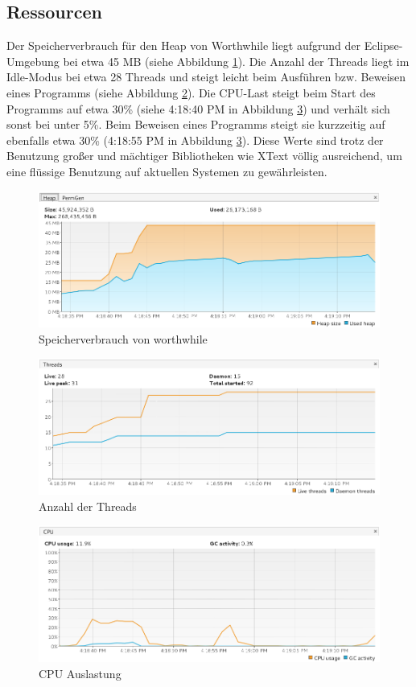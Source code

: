 \subsection{Ressourcen}
Der Speicherverbrauch für den Heap von Worthwhile liegt aufgrund der Eclipse-Umgebung bei etwa 45 MB (siehe Abbildung \ref{heapsize}). Die Anzahl der Threads liegt im Idle-Modus bei etwa 28 Threads und steigt leicht beim Ausführen bzw. Beweisen eines Programms (siehe Abbildung \ref{threadcount}). Die CPU-Last steigt beim Start des Programms auf etwa 30\% (siehe 4:18:40 PM in Abbildung \ref{cpuusage}) und verhält sich sonst bei unter 5\%. Beim Beweisen eines Programms steigt sie kurzzeitig auf ebenfalls etwa 30\% (4:18:55 PM in Abbildung \ref{cpuusage}). Diese Werte sind trotz der Benutzung großer und mächtiger Bibliotheken wie XText völlig ausreichend, um eine flüssige Benutzung auf aktuellen Systemen zu gewährleisten.

\begin{center}
	\begin{figure}
		\includegraphics[width=13cm]{images/worthwhile-ressourcen-heap.png}
		\caption{Speicherverbrauch von worthwhile}
 		\label{heapsize}
	\end{figure}
\end{center}

\begin{center}
	\begin{figure}[h]
		\includegraphics[width=13cm]{images/worthwhile-ressourcen-threads.png}
		\caption{Anzahl der Threads}
 		\label{threadcount}
	\end{figure}
\end{center}

\begin{center}
	\begin{figure}[h]
		\includegraphics[width=13cm]{images/worthwhile-ressourcen-cpu.png}
		\caption{CPU Auslastung}
 		\label{cpuusage}
	\end{figure}
\end{center}

